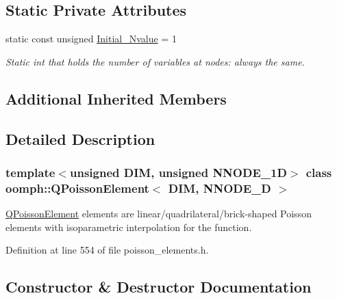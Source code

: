 \subsection*{Static Private Attributes}
\begin{DoxyCompactItemize}
\item 
static const unsigned \hyperlink{classoomph_1_1QPoissonElement_ae70e89737e1030ac25fff6b9e6ea7017}{Initial\+\_\+\+Nvalue} = 1
\begin{DoxyCompactList}\small\item\em Static int that holds the number of variables at nodes\+: always the same. \end{DoxyCompactList}\end{DoxyCompactItemize}
\subsection*{Additional Inherited Members}


\subsection{Detailed Description}
\subsubsection*{template$<$unsigned D\+IM, unsigned N\+N\+O\+D\+E\+\_\+1D$>$\newline
class oomph\+::\+Q\+Poisson\+Element$<$ D\+I\+M, N\+N\+O\+D\+E\+\_\+D $>$}

\hyperlink{classoomph_1_1QPoissonElement}{Q\+Poisson\+Element} elements are linear/quadrilateral/brick-\/shaped Poisson elements with isoparametric interpolation for the function. 

Definition at line 554 of file poisson\+\_\+elements.\+h.



\subsection{Constructor \& Destructor Documentation}
\mbox{\label{classoomph_1_1QPoissonElement_a64b6a13f87ce6f9b39cca767c948986f}} 
